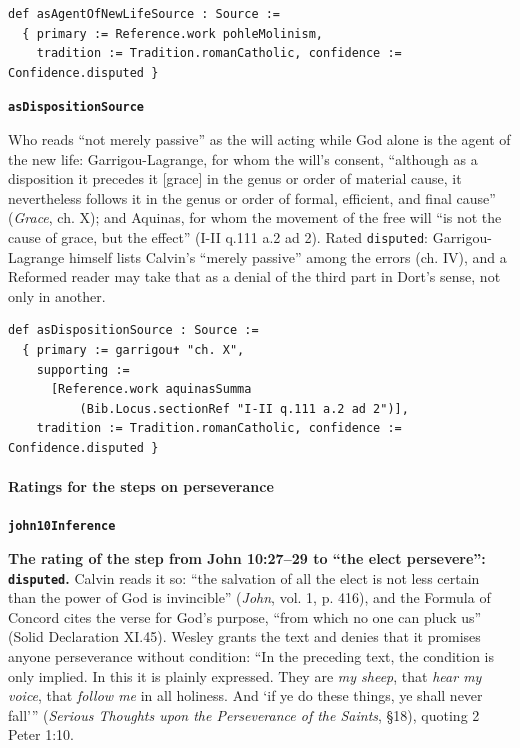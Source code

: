 \documentclass[11pt]{article}
\begin{document}
{\small\begin{verbatim}
def asAgentOfNewLifeSource : Source :=
  { primary := Reference.work pohleMolinism,
    tradition := Tradition.romanCatholic, confidence := Confidence.disputed }
\end{verbatim}}
\par\medskip\noindent\textbf{\texttt{as\allowbreak{}Disposition\allowbreak{}Source}}\par\nobreak\noindent
Who reads “not merely passive” as the will acting while God alone is the agent of the new life: Garrigou-Lagrange, for whom the will’s consent, “although as a disposition it precedes it [grace] in the genus or order of material cause, it nevertheless follows it in the genus or order of formal, efficient, and final cause” (\emph{Grace}, ch. X); and Aquinas, for whom the movement of the free will “is not the cause of grace, but the effect” (I-II q.111 a.2 ad 2). Rated \texttt{disputed}: Garrigou-Lagrange himself lists Calvin’s “merely passive” among the errors (ch. IV), and a Reformed reader may take that as a denial of the third part in Dort’s sense, not only in another.

{\small\begin{verbatim}
def asDispositionSource : Source :=
  { primary := garrigou✝ "ch. X",
    supporting :=
      [Reference.work aquinasSumma
          (Bib.Locus.sectionRef "I-II q.111 a.2 ad 2")],
    tradition := Tradition.romanCatholic, confidence := Confidence.disputed }
\end{verbatim}}
\paragraph*{Ratings for the steps on perseverance}
\leavevmode\par\nobreak
\par\medskip\noindent\textbf{\texttt{john10\allowbreak{}Inference}}\par\nobreak\noindent
\textbf{The rating of the step from John 10:27–29 to “the elect persevere”: \texttt{disputed}.} Calvin reads it so: “the salvation of all the elect is not less certain than the power of God is invincible” (\emph{John}, vol. 1, p. 416), and the Formula of Concord cites the verse for God’s purpose, “from which no one can pluck us” (Solid Declaration XI.45). Wesley grants the text and denies that it promises anyone perseverance without condition: “In the preceding text, the condition is only implied. In this it is plainly expressed. They are \emph{my sheep}, that \emph{hear my voice}, that \emph{follow me} in all holiness. And ‘if ye do these things, ye shall never fall’” (\emph{Serious Thoughts upon the Perseverance of the Saints}, §18), quoting 2 Peter 1:10.
\end{document}
